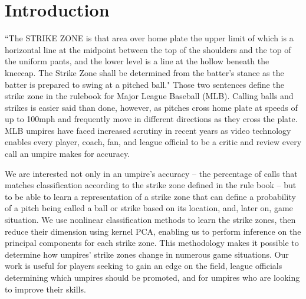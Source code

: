 \documentclass[letterpaper,12pt]{article}
\begin{document}


\section{Introduction}\label{sec:intro}

``The STRIKE ZONE is that area over home plate the upper limit of which is a horizontal line at the midpoint between the top of the shoulders and the top of the uniform pants, and the lower level is a line at the hollow beneath the kneecap. 
The Strike Zone shall be determined from the batter’s stance as the batter is prepared to swing at a pitched ball."\cite{mlbrules}
Those two sentences define the strike zone in the rulebook for Major League Baseball (MLB). 
Calling balls and strikes is easier said than done, however, as pitches cross home plate at speeds of up to 100mph and frequently move in different directions as they cross the plate. 
MLB umpires have faced increased scrutiny in recent years as video technology enables every player, coach, fan, and league official to be a critic and review every call an umpire makes for accuracy. 

We are interested not only in an umpire's accuracy -- the percentage of calls that matches classification according to the strike zone defined in the rule book -- but to be able to learn a representation of a strike zone that can define a probability of a pitch being called a ball or strike based on its location, and, later on, game situation.
We use nonlinear classification methods to learn the strike zones, then reduce their dimension using kernel PCA, enabling us to perform inference on the principal components for each strike zone. 
This methodology makes it possible to determine how umpires' strike zones change in numerous game situations. 
Our work is useful for players seeking to gain an edge on the field, league officials determining which umpires should be promoted, and for umpires who are looking to improve their skills. 




\end{document}
